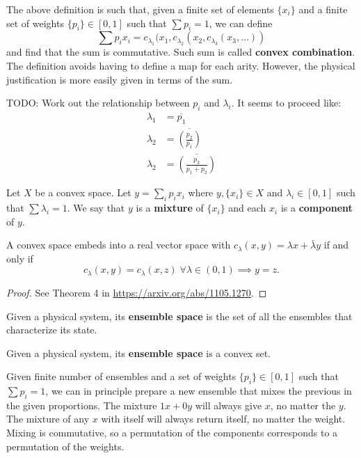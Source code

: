 \documentclass[11pt]{article}
\begin{document}
\begin{remark}
	The above definition is such that, given a finite set of elements $\{x_i\}$ and a finite set of weights $\{p_i\} \in [0,1]$ such that $\sum p_i = 1$, we can define
	$$\sum p_i x_i = c_{\lambda_1}(x_1, c_{\lambda_2}(x_2, c_{\lambda_3}(x_3, \dots))$$
	and find that the sum is commutative. Such sum is called \textbf{convex combination}. The definition avoids having to define a map for each arity. However, the physical justification is more easily given in terms of the sum.
	
	TODO: Work out the relationship between $p_i$ and $\lambda_i$. It seems to proceed like:
	\begin{equation}
		\begin{aligned}
			\lambda_1 &= \overline{p_1} \\
			\lambda_2 &= \overline{\left(\frac{p_2}{\overline{p_1}}\right)} \\
			\lambda_2 &= \overline{\left(\frac{p_3}{\overline{p_1+p_2}}\right)}
		\end{aligned}
	\end{equation}
\end{remark}

\begin{defn}
	Let $X$ be a convex space. Let $y = \sum_i p_i x_i$ where $y, \{x_i\} \in X$ and $\lambda_i \in [0,1]$ such that $\sum \lambda_i = 1$. We say that $y$ is a \textbf{mixture} of $\{x_i\}$ and each $x_i$ is a \textbf{component} of $y$.
\end{defn}


\begin{prop}
	A convex space embeds into a real vector space with $c_\lambda(x,y) = \lambda x + \bar{\lambda}y$ if and only if
	$$ c_\lambda(x,y) = c_\lambda(x,z) \; \forall \lambda \in (0,1) \implies y = z. $$
\end{prop}
\begin{proof}
	See Theorem 4 in \url{https://arxiv.org/abs/1105.1270}.
\end{proof}

\begin{defn}
	Given a physical system, its \textbf{ensemble space} is the set of all the ensembles that characterize its state. 
\end{defn}

\begin{prop}
	Given a physical system, its \textbf{ensemble space} is a convex set. 
\end{prop}
\begin{justification}
	Given finite number of ensembles and a set of weights $\{p_i\} \in [0,1]$ such that $\sum p_i = 1$, we can in principle prepare a new ensemble that mixes the previous in the given proportions. The mixture $1x+0y$ will always give $x$, no matter the $y$. The mixture of any $x$ with itself will always return itself, no matter the weight. Mixing is commutative, so a permutation of the components corresponds to a permutation of the weights.
\end{justification}
\end{document}
